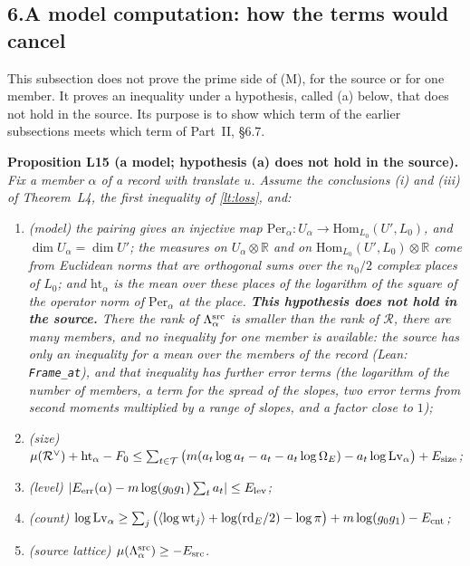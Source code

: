 \documentclass[11pt,letterpaper]{article}
\begin{document}
\subsection*{6.\quad A model computation: how the terms would cancel}

This subsection does not prove the prime side of (M), for the source or for one member. It proves an
inequality under a hypothesis, called (a) below, that does not hold in the source. Its purpose is to show
which term of the earlier subsections meets which term of Part~II, \S6.7.

\textbf{Proposition L15 (a model; hypothesis \textup{(a)} does not hold in the source).} \emph{Fix a
member $\alpha$ of a record with translate $u$. Assume the conclusions \textup{(i)} and \textup{(iii)} of
Theorem~L4, the first inequality of \eqref{lt:loss}, and:}
\begin{enumerate}[label=\textup{(\alph*)},leftmargin=2.4em,itemsep=1pt,topsep=2pt]
\item \emph{(model) the pairing gives an injective map
$\mathrm{Per}_\alpha:U_\alpha\to\mathrm{Hom}_{L_0}(U',L_0)$, and $\dim U_\alpha=\dim U'$; the measures on
$U_\alpha\otimes\mathbb R$ and on $\mathrm{Hom}_{L_0}(U',L_0)\otimes\mathbb R$ come from Euclidean norms
that are orthogonal sums over the $n_0/2$ complex places of $L_0$; and $\mathrm{ht}_\alpha$ is the mean
over these places of the logarithm of the square of the operator norm of $\mathrm{Per}_\alpha$ at the
place. \textbf{This hypothesis does not hold in the source.} There the rank of
$\Lambda^{\rm src}_\alpha$ is smaller than the rank of $\mathcal R$, there are many members, and no
inequality for one member is available: the source has only an inequality for a mean over the members of
the record (Lean: \texttt{Frame\_at}), and that inequality has further error terms (the logarithm of the
number of members, a term for the spread of the slopes, two error terms from second moments multiplied by
a range of slopes, and a factor close to $1$);}
\item \emph{(size) $\mu(\mathcal R^\vee)+\mathrm{ht}_\alpha-F_0\le\sum_{t\in\mathcal T}\big(m(a_t\log a_t-a_t-a_t\log\Omega_E)-a_t\log\mathrm{Lv}_\alpha\big)+E_{\rm size}$;}
\item \emph{(level) $|E_{\rm err}(\alpha)-m\log(g_0g_1)\sum_ta_t|\le E_{\rm lev}$;}
\item \emph{(count) $\log\mathrm{Lv}_\alpha\ge\sum_{j}\big(\langle\log\mathrm{wt}_j\rangle+\log(\mathrm{rd}_E/2)-\log\pi\big)+m\log(g_0g_1)-E_{\rm cnt}$;}
\item \emph{(source lattice) $\mu(\Lambda^{\rm src}_\alpha)\ge-E_{\rm src}$.}
\end{enumerate}
\end{document}
